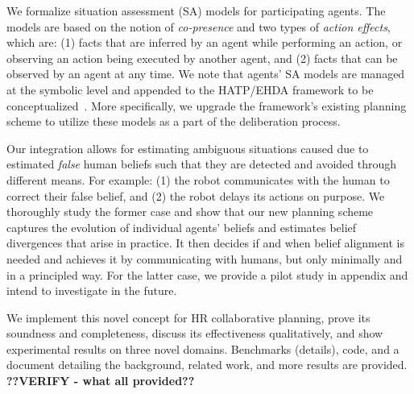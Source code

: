 \documentclass[letterpaper]{article} %
\begin{document}
We formalize situation assessment (SA) models for participating agents. 
The models are based on the notion of {\em co-presence} and two types of \textit{action effects}, which are: (1) facts that are inferred by an agent while performing an action, or observing an action being executed by another agent, and (2) facts that can be observed by an agent at any time.
We note that agents' SA models are managed at the symbolic level and appended to the HATP/EHDA framework to be conceptualized~\cite{buisan:hal-03684211}. 
More specifically, we upgrade the framework's existing planning scheme to utilize these models as a part of the deliberation process.   

Our integration allows for estimating ambiguous situations caused due to estimated \textit{false} human beliefs such that they are detected and avoided through different means. 
For example: (1) the robot communicates with the human to correct their false belief, and (2) the robot delays its actions on purpose. We thoroughly study the former case and show that our new planning scheme captures the evolution of individual agents' beliefs and estimates belief divergences that arise in practice. 
It then decides if and when belief alignment is needed and achieves it by communicating with humans, but only minimally and in a principled way. 
For the latter case, we provide a pilot study in appendix and intend to investigate in the future.   

We implement this novel concept for HR collaborative planning, prove its soundness and completeness, discuss its effectiveness qualitatively, and show experimental results on three novel domains. Benchmarks (details), code, and a document detailing the background, related work, and more results are provided. 
\textbf{??VERIFY - what all provided??}

\end{document}
